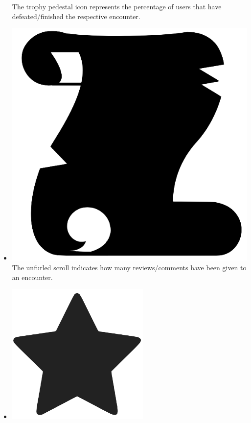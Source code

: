 \documentclass[12pt,a4paper]{report}
\begin{document}
\begin{itemize}
		The trophy pedestal icon represents the percentage of users that have defeated/finished the respective encounter.
		\begin{figure}
			\label{fig: Win Rate Icon}
		\end{figure}
		\item \includegraphics[scale=.03]{scroll}
		The unfurled scroll indicates how many reviews/comments have been given to an encounter.
		\begin{figure}
			\label{fig: Comments Icon}
		\end{figure}
		\item \includegraphics[scale=.07]{rating_icon}

\end{itemize}
\end{document}
